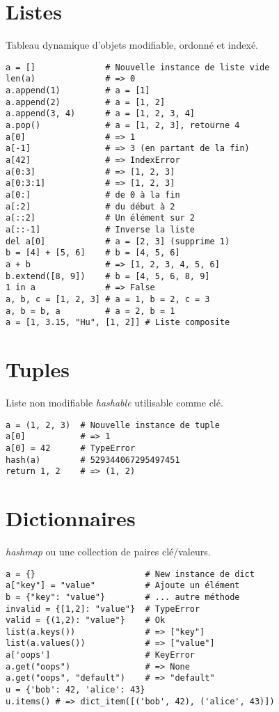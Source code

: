 \documentclass{article}
\begin{document}
\begin{multicols*}{4}
\begin{lstlisting}
\end{lstlisting}

\section*{Listes}
Tableau dynamique d'objets modifiable, ordonné et indexé.
\begin{lstlisting}
a = []              # Nouvelle instance de liste vide
len(a)              # => 0
a.append(1)         # a = [1]
a.append(2)         # a = [1, 2]
a.append(3, 4)      # a = [1, 2, 3, 4]
a.pop()             # a = [1, 2, 3], retourne 4
a[0]                # => 1
a[-1]               # => 3 (en partant de la fin)
a[42]               # => IndexError
a[0:3]              # => [1, 2, 3]
a[0:3:1]            # => [1, 2, 3]
a[0:]               # de 0 à la fin
a[:2]               # du début à 2
a[::2]              # Un élément sur 2
a[::-1]             # Inverse la liste
del a[0]            # a = [2, 3] (supprime 1)
b = [4] + [5, 6]    # b = [4, 5, 6]
a + b               # => [1, 2, 3, 4, 5, 6]
b.extend([8, 9])    # b = [4, 5, 6, 8, 9]
1 in a              # => False
a, b, c = [1, 2, 3] # a = 1, b = 2, c = 3
a, b = b, a         # a = 2, b = 1
a = [1, 3.15, "Hu", [1, 2]] # Liste composite
\end{lstlisting}

\section*{Tuples}
Liste non modifiable \emph{hashable} utilisable comme clé.
\begin{lstlisting}
a = (1, 2, 3)  # Nouvelle instance de tuple
a[0]           # => 1
a[0] = 42      # TypeError
hash(a)        # 529344067295497451
return 1, 2    # => (1, 2)
\end{lstlisting}

\section*{Dictionnaires}
\emph{hashmap} ou une collection de paires clé/valeurs.
\begin{lstlisting}
a = {}                      # New instance de dict
a["key"] = "value"          # Ajoute un élément
b = {"key": "value"}        # ... autre méthode
invalid = {[1,2]: "value"}  # TypeError
valid = {(1,2): "value"}    # Ok
list(a.keys())              # => ["key"]
list(a.values())            # => ["value"]
a['oops']                   # KeyError
a.get("oops")               # => None
a.get("oops", "default")    # => "default"
u = {'bob': 42, 'alice': 43}
u.items() # => dict_item([('bob', 42), ('alice', 43)])
\end{lstlisting}


\end{multicols*}
\end{document}
